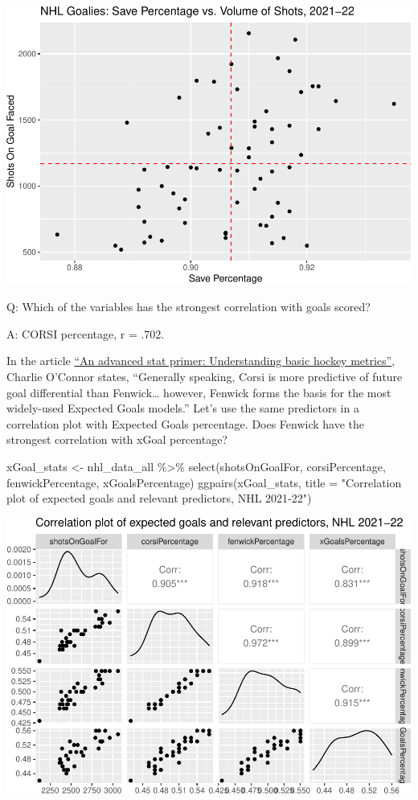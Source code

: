 \documentclass[
  11pt,
]{book}
\newenvironment{Shaded}{\begin{snugshade}}{\end{snugshade}}
\newcommand{\AttributeTok}[1]{\textcolor[rgb]{0.77,0.63,0.00}{#1}}
\newcommand{\FunctionTok}[1]{\textcolor[rgb]{0.00,0.00,0.00}{#1}}
\newcommand{\NormalTok}[1]{#1}
\newcommand{\OtherTok}[1]{\textcolor[rgb]{0.56,0.35,0.01}{#1}}
\newcommand{\SpecialCharTok}[1]{\textcolor[rgb]{0.00,0.00,0.00}{#1}}
\newcommand{\StringTok}[1]{\textcolor[rgb]{0.31,0.60,0.02}{#1}}
\theoremstyle{definition}
\theoremstyle{definition}
\theoremstyle{definition}
\theoremstyle{definition}
\theoremstyle{remark}
\begin{document}
\includegraphics{series_files/figure-latex/unnamed-chunk-29-1.pdf}

Q: Which of the variables has the strongest correlation with goals scored?

A: CORSI percentage, r = .702.

In the article \href{https://theathletic.com/121980/2017/10/09/an-advanced-stat-primer-understanding-basic-hockey-metrics/}{``An advanced stat primer: Understanding basic hockey metrics''}, Charlie O'Connor states, ``Generally speaking, Corsi is more predictive of future goal differential than Fenwick\ldots{} however, Fenwick forms the basis for the most widely-used Expected Goals models.'' Let's use the same predictors in a correlation plot with Expected Goals percentage. Does Fenwick have the strongest correlation with xGoal percentage?

\begin{Shaded}
\begin{Highlighting}[]
\NormalTok{xGoal\_stats }\OtherTok{\textless{}{-}}\NormalTok{ nhl\_data\_all }\SpecialCharTok{\%\textgreater{}\%}
    \FunctionTok{select}\NormalTok{(shotsOnGoalFor, corsiPercentage, fenwickPercentage, xGoalsPercentage)}
\FunctionTok{ggpairs}\NormalTok{(xGoal\_stats, }\AttributeTok{title =} \StringTok{"Correlation plot of expected goals and relevant predictors, NHL 2021{-}22"}\NormalTok{)}
\end{Highlighting}
\end{Shaded}

\includegraphics{series_files/figure-latex/hockey ggplot 6-1.pdf}
\end{document}
